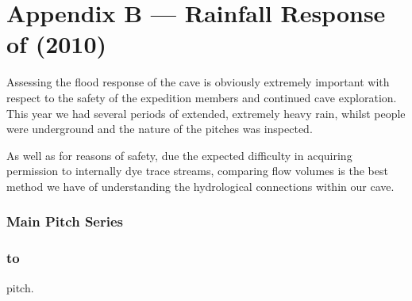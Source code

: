\chapter{Appendix B --- Rainfall Response of  (2010)}


Assessing the flood response of the cave is obviously extremely important
with respect to the safety of the expedition members and continued
cave exploration. This year we had several periods of extended, extremely
heavy rain, whilst people were underground and the nature of the pitches
was inspected.

As well as for reasons of safety, due the expected difficulty in acquiring
permission to internally dye trace streams, comparing flow volumes
is the best method we have of understanding the hydrological connections
within our cave.

\subsection{ Main Pitch Series}

\subsection{ to }


\begin{marginfigure}
\checkoddpage \ifoddpage \forcerectofloat \else \forceversofloat \fi
\centering
 \caption{\protect{} pitch. }
 \label{pico square}
\end{marginfigure}


